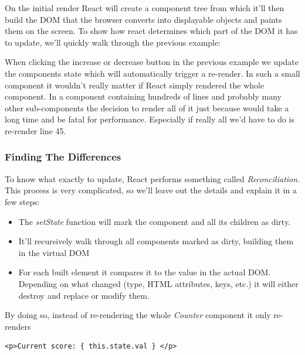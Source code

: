 On the initial render React will create a component tree from which it'll then build the DOM that the browser converts into displayable objects and paints them on the screen. To show how react determines which part of the DOM it has to update, we'll quickly walk through the previous example:

When clicking the increase or decrease button in the previous example we update the components state which will automatically trigger a re-render. In such a small component it wouldn't really matter if React simply rendered the whole component. In a component containing hundreds of lines and probably many other sub-components the decision to render all of it just because would take a long time and be fatal for performance. Especially if really all we'd have to do is re-render line 45.

\subsubsection{Finding The Differences}
To know what exactly to update, React performs something called \emph{Reconciliation}. This process is very complicated, so we'll leave out the details and explain it in a few steps: 
\begin{itemize}
\item The \emph{setState} function will mark the component and all its children as dirty. \cite{GethylGeorgeKurian}
\item It'll recursively walk through all components marked as dirty, building them in the virtual DOM \cite{GethylGeorgeKurian}
\item For each built element it compares it to the value in the actual DOM. Depending on what changed (type, HTML attributes, keys, etc.) it will either destroy and replace or modify them.  \cite{ReactDocs} 
\end{itemize}
By doing so, instead of re-rendering the whole \emph{Counter} component it only re-renders
\begin{lstlisting}[caption={Updated line}]
<p>Current score: { this.state.val } </p>
\end{lstlisting}

